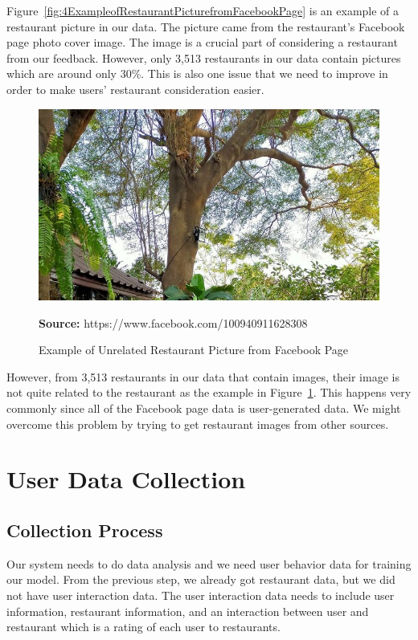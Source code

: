 \documentclass[12pt,oneside,openright,a4paper]{cpe-english-project}
\newcommand*{\captionsource}[2]{%
  \caption[{#1}]{#1}\vspace{-8pt}
  \textbf{Source:} #2}
\begin{document}
Figure~\ref{fig:4ExampleofRestaurantPicturefromFacebookPage} is an example of a restaurant picture in our data. The picture came from the restaurant's Facebook page photo cover image. The image is a crucial part of considering a restaurant from our feedback. However, only 3,513 restaurants in our data contain pictures which are around only 30\%. This is also one issue that we need to improve in order to make users’ restaurant consideration easier.

\begin{figure}[H]\centering
\includegraphics[width=350pt]{./images/4ExampleofUnrelatedRestaurantPicturefromFacebookPage.jpeg}
\captionsource{Example of Unrelated Restaurant Picture from Facebook Page}{https://www.facebook.com/100940911628308}\label{fig:4ExampleofUnrelatedRestaurantPicturefromFacebookPage}
\end{figure}

However, from 3,513 restaurants in our data that contain images, their image is not quite related to the restaurant as the example in Figure~\ref{fig:4ExampleofUnrelatedRestaurantPicturefromFacebookPage}. This happens very commonly since all of the Facebook page data is user-generated data. We might overcome this problem by trying to get restaurant images from other sources.


\section{User Data Collection}

\subsection{Collection Process}

Our system needs to do data analysis and we need user behavior data for training our model. From the previous step, we already got restaurant data, but we did not have user interaction data. The user interaction data needs to include user information, restaurant information, and an interaction between user and restaurant which is a rating of each user to restaurants.
\end{document}
